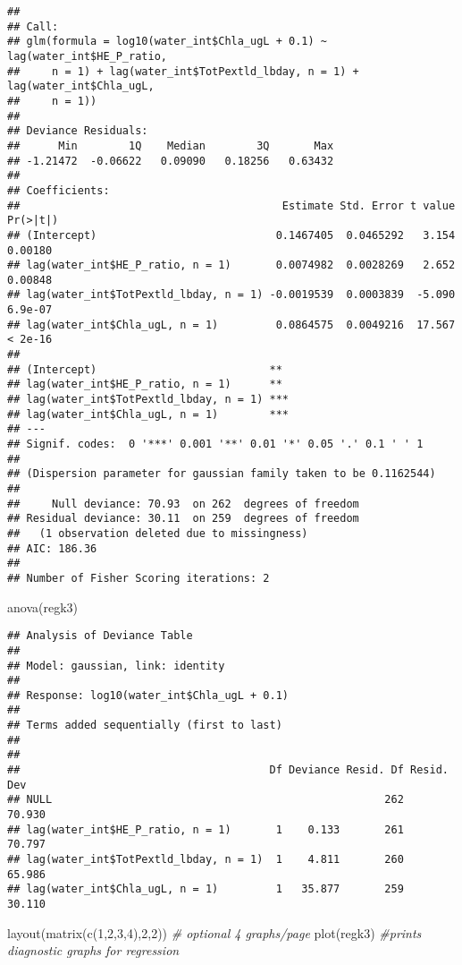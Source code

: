 \documentclass[
]{article}
\newenvironment{Shaded}{\begin{snugshade}}{\end{snugshade}}
\newcommand{\CommentTok}[1]{\textcolor[rgb]{0.56,0.35,0.01}{\textit{#1}}}
\newcommand{\DecValTok}[1]{\textcolor[rgb]{0.00,0.00,0.81}{#1}}
\newcommand{\FunctionTok}[1]{\textcolor[rgb]{0.00,0.00,0.00}{#1}}
\newcommand{\NormalTok}[1]{#1}
\begin{document}
\begin{verbatim}
## 
## Call:
## glm(formula = log10(water_int$Chla_ugL + 0.1) ~ lag(water_int$HE_P_ratio, 
##     n = 1) + lag(water_int$TotPextld_lbday, n = 1) + lag(water_int$Chla_ugL, 
##     n = 1))
## 
## Deviance Residuals: 
##      Min        1Q    Median        3Q       Max  
## -1.21472  -0.06622   0.09090   0.18256   0.63432  
## 
## Coefficients:
##                                         Estimate Std. Error t value Pr(>|t|)
## (Intercept)                            0.1467405  0.0465292   3.154  0.00180
## lag(water_int$HE_P_ratio, n = 1)       0.0074982  0.0028269   2.652  0.00848
## lag(water_int$TotPextld_lbday, n = 1) -0.0019539  0.0003839  -5.090  6.9e-07
## lag(water_int$Chla_ugL, n = 1)         0.0864575  0.0049216  17.567  < 2e-16
##                                          
## (Intercept)                           ** 
## lag(water_int$HE_P_ratio, n = 1)      ** 
## lag(water_int$TotPextld_lbday, n = 1) ***
## lag(water_int$Chla_ugL, n = 1)        ***
## ---
## Signif. codes:  0 '***' 0.001 '**' 0.01 '*' 0.05 '.' 0.1 ' ' 1
## 
## (Dispersion parameter for gaussian family taken to be 0.1162544)
## 
##     Null deviance: 70.93  on 262  degrees of freedom
## Residual deviance: 30.11  on 259  degrees of freedom
##   (1 observation deleted due to missingness)
## AIC: 186.36
## 
## Number of Fisher Scoring iterations: 2
\end{verbatim}

\begin{Shaded}
\begin{Highlighting}[]
\FunctionTok{anova}\NormalTok{(regk3)}
\end{Highlighting}
\end{Shaded}

\begin{verbatim}
## Analysis of Deviance Table
## 
## Model: gaussian, link: identity
## 
## Response: log10(water_int$Chla_ugL + 0.1)
## 
## Terms added sequentially (first to last)
## 
## 
##                                       Df Deviance Resid. Df Resid. Dev
## NULL                                                    262     70.930
## lag(water_int$HE_P_ratio, n = 1)       1    0.133       261     70.797
## lag(water_int$TotPextld_lbday, n = 1)  1    4.811       260     65.986
## lag(water_int$Chla_ugL, n = 1)         1   35.877       259     30.110
\end{verbatim}

\begin{Shaded}
\begin{Highlighting}[]
\FunctionTok{layout}\NormalTok{(}\FunctionTok{matrix}\NormalTok{(}\FunctionTok{c}\NormalTok{(}\DecValTok{1}\NormalTok{,}\DecValTok{2}\NormalTok{,}\DecValTok{3}\NormalTok{,}\DecValTok{4}\NormalTok{),}\DecValTok{2}\NormalTok{,}\DecValTok{2}\NormalTok{)) }\CommentTok{\# optional 4 graphs/page}
\FunctionTok{plot}\NormalTok{(regk3) }\CommentTok{\#prints diagnostic graphs for regression}
\end{Highlighting}
\end{Shaded}
\end{document}
